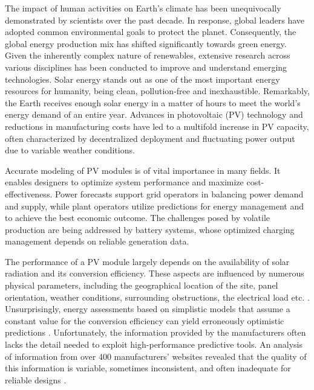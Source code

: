 
The impact of human activities on Earth's climate has been unequivocally demonstrated
by scientists over the past decade. In response, global leaders have adopted common 
environmental goals to protect the planet. Consequently, the global energy production mix
has shifted significantly towards green energy. Given the inherently complex nature of
renewables, extensive research across various disciplines has been conducted to improve and 
understand emerging technologies. Solar energy stands out as one of the most important energy
resources for humanity, being clean, pollution-free and inexhaustible. Remarkably, the Earth
receives enough solar energy in a matter of hours to meet the world's energy demand of an
entire year. Advances in photovoltaic (PV) technology and reductions in manufacturing costs
have led to a multifold increase in PV capacity, often characterized by decentralized deployment
and fluctuating power output due to variable weather conditions.

Accurate modeling of PV modules is of vital importance in many fields.
It enables designers to optimize system performance and maximize cost-effectiveness.
Power forecasts support grid operators in balancing power demand and supply, while
plant operators utilize predictions for energy management and to achieve the best economic
outcome. The challenges posed by volatile production are being addressed by battery
systems, whose optimized charging management depends on reliable generation data.

The performance of a PV module largely depends on the availability of solar 
radiation and its conversion efficiency. These aspects are influenced by numerous
physical parameters, including the geographical location of the
site, panel orientation, weather conditions, surrounding obstructions,
the electrical load etc. \cite[p. 1358f]{LoBrano}. Unsurprisingly, energy assessments
based on simplistic models that assume a constant value for the conversion
efficiency can yield erroneously optimistic predictions \cite{Wang2021}.
Unfortunately, the information provided by the manufacturers often lacks the detail
needed to exploit high-performance predictive tools. An analysis of information
from over 400 manufacturers' websites revealed that the quality of this information is variable,
sometimes inconsistent, and often inadequate for reliable designs \cite[p. 1161]{Orioli}.

